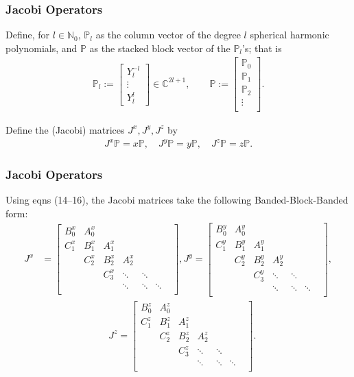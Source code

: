\documentclass[10pt]{beamer}
\newcommand{\C}{\mathbb{C}}
\newcommand{\No}{\mathbb{N}_0}
\newcommand{\bigP}{\mathbb{P}}
\newcommand{\Pl}{\mathbb{P}_l}
\begin{document}
\frame
{
    \frametitle{Jacobi Operators}

Define, for \(l \in \No\), \(\Pl\) as the column vector of the degree \(l\) spherical harmonic polynomials, and \(\bigP\) as the stacked block vector of the \(\Pl\)'s; that is
\begin{align}
\Pl := \begin{bmatrix}
		Y^{-l}_l \\
		\vdots \\
		Y^l_l
	\end{bmatrix} \in \C^{2l+1}, 
\quad \quad 
\bigP := \begin{bmatrix}
		\bigP_0 \\
		\hline
		\bigP_1 \\
		\hline
		\bigP_2 \\
		\vdots \\
	\end{bmatrix}.
\end{align}

Define the (Jacobi) matrices \(J^x, J^y, J^z\) by 
\begin{align}
J^x \bigP = x \bigP, \quad J^y \bigP = y \bigP, \quad J^z \bigP = z \bigP.
\end{align}

}

\frame
{
    \frametitle{Jacobi Operators}
Using eqns (14--16), the Jacobi matrices take the following Banded-Block-Banded form:
\begin{align}
J^x &= \begin{bmatrix}
		B^x_0 & A^x_0 & & & & \\
		C^x_1 & B^x_1 & A^x_1 & & & \\
		& C^x_2 & B^x_2 & A^x_2  & & & \\
		& & C^x_3 & \ddots & \ddots & \\
		& & & \ddots & \ddots & \ddots \\
	\end{bmatrix},
J^y = \begin{bmatrix}
		B^y_0 & A^y_0 & & & & \\
		C^y_1 & B^y_1 & A^y_1 & & & \\
		& C^y_2 & B^y_2 & A^y_2  & & & \\
		& & C^y_3 & \ddots & \ddots & \\
		& & & \ddots & \ddots & \ddots \\
	\end{bmatrix}, \nonumber \\
&\quad \quad \quad \quad \quad \quad \quad J^z = \begin{bmatrix}
		B^z_0 & A^z_0 & & & & \\
		C^z_1 & B^z_1 & A^z_1 & & & \\
		& C^z_2 & B^z_2 & A^z_2  & & & \\
		& & C^z_3 & \ddots & \ddots & \\
		& & & \ddots & \ddots & \ddots \\
	\end{bmatrix}.
\end{align}

}
\end{document}
